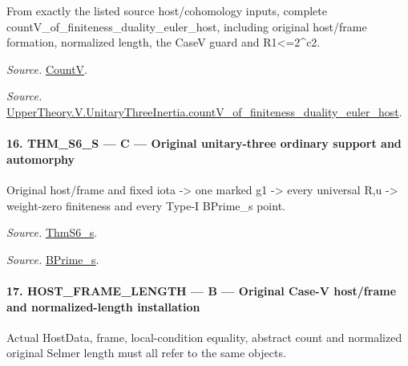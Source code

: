 \documentclass[11pt,a4paper]{article}
\numberwithin{equation}{section}
\theoremstyle{remark}\newtheorem{remark}[theorem]{Remark}
\begin{document}
From exactly the listed source host/cohomology inputs, complete countV\_\allowbreak of\_\allowbreak finiteness\_\allowbreak duality\_\allowbreak euler\_\allowbreak host, including original host/frame formation, normalized length, the CaseV guard and R1<=2\textasciicircum{}c2.

\emph{Source.} \href{https://github.com/CocoSgt/riemann-hypothesis-lean/blob/7cbf7a0c32fca1badf05931879a37c3f8a2b03b4/src/Development/AutomorphicArithmetic/AutomorphicVarieties/HeightAndVanishing/Counts.lean#L69-L69}{CountV}.

\emph{Source.} \href{https://github.com/CocoSgt/riemann-hypothesis-lean/blob/7cbf7a0c32fca1badf05931879a37c3f8a2b03b4/src/Development/AutomorphicArithmetic/AutomorphicVarieties/ModularityArgument/ThresholdArguments/DenseThresholdCases/CountVOf.lean#L33-L60}{UpperTheory.V.UnitaryThreeInertia.countV\_\allowbreak of\_\allowbreak finiteness\_\allowbreak duality\_\allowbreak euler\_\allowbreak host}.



\paragraph{16. THM\_\allowbreak S6\_\allowbreak S — C — Original unitary-three ordinary support and automorphy}

Original host/frame and fixed iota -> one marked g1 -> every universal R,u -> weight-zero finiteness and every Type-I BPrime\_\allowbreak s point.

\emph{Source.} \href{https://github.com/CocoSgt/riemann-hypothesis-lean/blob/7cbf7a0c32fca1badf05931879a37c3f8a2b03b4/src/Development/AutomorphicArithmetic/AutomorphicVarieties/ModularityArgument/ThresholdArguments/DenseThresholdCases/ThmS6CoreS.lean#L17-L26}{ThmS6\_\allowbreak s}.

\emph{Source.} \href{https://github.com/CocoSgt/riemann-hypothesis-lean/blob/7cbf7a0c32fca1badf05931879a37c3f8a2b03b4/src/Development/AutomorphicArithmetic/AutomorphicVarieties/ModularityArgument/ThresholdArguments/DenseThresholdCases/ThmS6CoreS.lean#L12-L16}{BPrime\_\allowbreak s}.



\paragraph{17. HOST\_\allowbreak FRAME\_\allowbreak LENGTH — B — Original Case-V host/frame and normalized-length installation}

Actual HostData, frame, local-condition equality, abstract count and normalized original Selmer length must all refer to the same objects.
\end{document}

